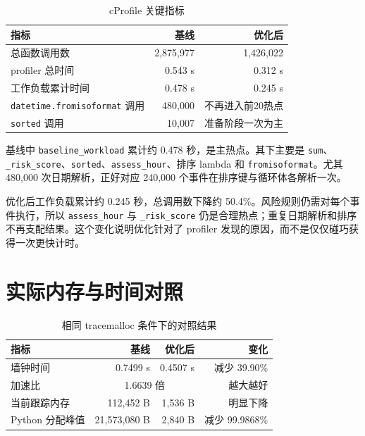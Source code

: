 \documentclass[UTF8,zihao=-4,a4paper]{ctexart}
\newcommand{\code}[1]{\texttt{#1}}
\begin{document}
\begin{table}[htbp]
\centering
\caption{cProfile 关键指标}
\begin{tabular}{lrr}
\toprule
指标 & 基线 & 优化后 \\
\midrule
总函数调用数 & 2,875,977 & 1,426,022 \\
profiler 总时间 & 0.543 s & 0.312 s \\
工作负载累计时间 & 0.478 s & 0.245 s \\
\code{datetime.fromisoformat} 调用 & 480,000 & 不再进入前20热点 \\
\code{sorted} 调用 & 10,007 & 准备阶段一次为主 \\
\bottomrule
\end{tabular}
\end{table}

基线中 \code{baseline\_workload} 累计约 0.478 秒，是主热点。其下主要是 \code{sum}、\code{\_risk\_score}、\code{sorted}、\code{assess\_hour}、排序 lambda 和 \code{fromisoformat}。尤其 480,000 次日期解析，正好对应 240,000 个事件在排序键与循环体各解析一次。

优化后工作负载累计约 0.245 秒，总调用数下降约 50.4\%。风险规则仍需对每个事件执行，所以 \code{assess\_hour} 与 \code{\_risk\_score} 仍是合理热点；重复日期解析和排序不再支配结果。这个变化说明优化针对了 profiler 发现的原因，而不是仅仅碰巧获得一次更快计时。

\section{实际内存与时间对照}

\begin{table}[htbp]
\centering
\caption{相同 tracemalloc 条件下的对照结果}
\begin{tabular}{lrrr}
\toprule
指标 & 基线 & 优化后 & 变化 \\
\midrule
墙钟时间 & 0.7499 s & 0.4507 s & 减少 39.90\% \\
加速比 & \multicolumn{2}{c}{1.6639 倍} & 越大越好 \\
当前跟踪内存 & 112,452 B & 1,536 B & 明显下降 \\
Python 分配峰值 & 21,573,080 B & 2,840 B & 减少 99.9868\% \\
\bottomrule
\end{tabular}
\end{table}

\begin{center}
\end{center}
\end{document}
